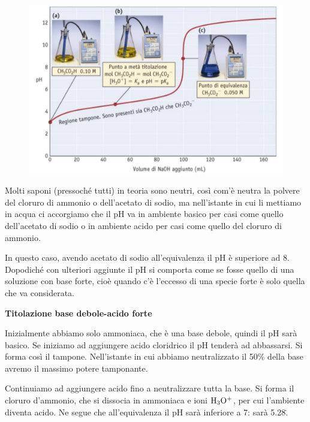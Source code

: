 \begin{figure}[H]
    \centering
    \includegraphics[width=14cm]{immagini/titolazione_acido_debole_base_forte.png}
\end{figure}

Molti saponi (pressoché tutti) in teoria sono neutri, così com'è neutra la polvere del cloruro di ammonio o dell'acetato di sodio, ma nell'istante in cui li mettiamo in acqua ci accorgiamo che il pH va in ambiente basico per casi come quello dell'acetato di sodio o in ambiente acido per casi come quello del cloruro di ammonio.

In questo caso, avendo acetato di sodio all'equivalenza il pH è superiore ad 8. Dopodiché con ulteriori aggiunte il pH si comporta come se fosse quello di una soluzione con base forte, cioè quando c'è l'eccesso di una specie forte è solo quella che va considerata.

\vspace{0.2cm}\textbf{Titolazione base debole-acido forte}

\vspace{0.2cm}Inizialmente abbiamo solo ammoniaca, che è una base debole, quindi il pH sarà basico. Se iniziamo ad aggiungere acido cloridrico il pH tenderà ad abbassarsi. Si forma così il tampone. Nell'istante in cui abbiamo neutralizzato il 50\% della base avremo il massimo potere tamponante.

Continuiamo ad aggiungere acido fino a neutralizzare tutta la base. Si forma il cloruro d'ammonio, che si dissocia in ammoniaca e ioni $\rm H_3O^+$, per cui l'ambiente diventa acido. Ne segue che all'equivalenza il pH sarà inferiore a 7: sarà 5.28\..

